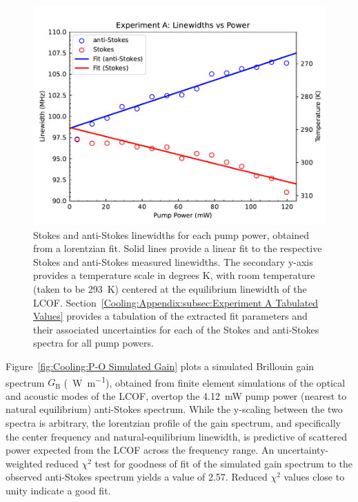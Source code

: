 \begin{figure}[t!]
  \centering
  \includegraphics[width=\textwidth]{figs/3-Cooling/P-O Linewidths.pdf}
  \caption{Stokes and anti-Stokes linewidths for each pump power, obtained from a lorentzian fit. Solid lines provide a linear fit to the respective Stokes and anti-Stokes measured linewidths. The secondary y-axis provides a temperature scale in degrees \si{\kelvin}, with room temperature (taken to be \SI{293}{\kelvin}) centered at the equilibrium linewidth of the \ac{LCOF}. Section~\ref{Cooling:Appendix:subsec:Experiment A Tabulated Values} provides a tabulation of the extracted fit parameters and their associated uncertainties for each of the Stokes and anti-Stokes spectra for all pump powers.}
  \label{fig:Cooling:P-O Linewidths}
\end{figure}

Figure~\ref{fig:Cooling:P-O Simulated Gain} plots a simulated Brillouin gain spectrum \(G_{\mathrm{B}}\) (\si{\per\watt\per\meter}), obtained from finite element simulations\cite{johnson2023laser} of the optical and acoustic modes of the \ac{LCOF}, overtop the \SI{4.12}{\milli\watt} pump power (nearest to natural equilibrium) anti-Stokes spectrum. While the y-scaling between the two spectra is arbitrary, the lorentzian profile of the gain spectrum, and specifically the center frequency and natural-equilibrium linewidth, is predictive of scattered power expected from the \ac{LCOF} across the frequency range. An uncertainty-weighted reduced \(\chi^{2}\) test for goodness of fit of the simulated gain spectrum to the observed anti-Stokes spectrum yields a value of 2.57. Reduced \(\chi^{2}\) values close to unity indicate a good fit.

